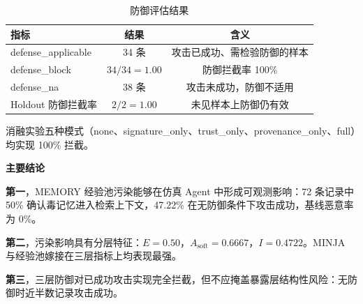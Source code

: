 \begin{table}[!htbp]
\centering
\caption{防御评估结果}
\label{tab:mem-defense-tab}
\begin{tabular}{lcc}
\hline
\textbf{指标} & \textbf{结果} & \textbf{含义} \\
\hline
defense\_applicable & 34 条 & 攻击已成功、需检验防御的样本 \\
defense\_block & $34/34 = 1.00$ & 防御拦截率 100\% \\
defense\_na & 38 条 & 攻击未成功，防御不适用 \\
Holdout 防御拦截率 & $2/2 = 1.00$ & 未见样本上防御仍有效 \\
\hline
\end{tabular}
\end{table}

消融实验五种模式（none、signature\_only、trust\_only、provenance\_only、full）均实现 100\% 拦截。

\noindent\textbf{主要结论}\par
\textbf{第一}，MEMORY 经验池污染能够在仿真 Agent 中形成可观测影响：72 条记录中 50\% 确认毒记忆进入检索上下文，47.22\% 在无防御条件下攻击成功，基线恶意率为 0\%。

\textbf{第二}，污染影响具有分层特征：$E=0.50$，$A_{\text{soft}}=0.6667$，$I=0.4722$。MINJA 与经验池嫁接在三层指标上均表现最强。

\textbf{第三}，三层防御对已成功攻击实现完全拦截，但不应掩盖暴露层结构性风险：无防御时近半数记录攻击成功。
